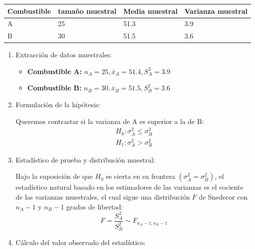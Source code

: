 \begin{enumerate}[label=\color{red}\textbf{\arabic*)}]
	      {
		      \color{lightblue}
		      \begin{center}
			      \begin{tabular}{llll}
				      \hline
				      Combustible & tamaño muestral & Media muestral & Varianza muestral \\ \hline
				      A           & 25              & 51.3           & 3.9               \\
				      B           & 30              & 51.5           & 3.6               \\ \hline
			      \end{tabular}
		      \end{center}
	      }


	      \begin{enumerate}[label=\arabic*)]
		      \item Extracción de datos muestrales:
		            \begin{itemize}[label=\textbullet]
			            \item \textbf{Combustible A:} $n_A=25,\bar{x}_A=51.4,S_A^2=3.9$
			            \item \textbf{Combustible B:} $n_B=30,\bar{x}_B=51.5,S_B^2=3.6$
		            \end{itemize}
		      \item Formulación de la hipótesis:

		            Queremos contrastar si la varianza de A es superior a la de B: \[
			            \begin{array}{l}
				            H_0:\sigma_A^2\le \sigma_B^2 \\
				            H_1:\sigma_A^2>\sigma_B^2
			            \end{array}
		            \]
		      \item Estadístico de prueba y distribución muestral:

		            Bajo la suposición de que $H_0$ es cierta en su frontera $(\sigma_A^2=\sigma_B^2)$, el estadístico natural basado en los estimadores de las varianzas es el cociente de las varianzas muestrales, el cual sigue una distribución $F$ de Snedecor con $n_A-1$ y $n_B-1$ grados de libertad: \[
			            F=\dfrac{S_A^2}{S_B^2}\sim F_{n_A-1,n_B-1}
		            \]
		      \item Cálculo del valor observado del estadístico:


\end{enumerate}
\end{enumerate}

